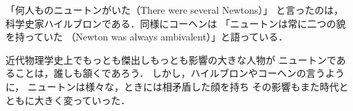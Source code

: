 \documentclass{jsarticle}
\begin{document}
「何人ものニュートンがいた（There were several Newtons）」
と言ったのは，科学史家ハイルブロンである．同様にコーヘンは
「ニュートンは常に二つの貌を持っていた
（Newton was always ambivalent）」と語っている．

近代物理学史上でもっとも傑出しもっとも影響の大きな人物が
ニュートンであることは，誰しも頷くであろう．
しかし，ハイルブロンやコーヘンの言うように，
ニュートンは様々な，ときには相矛盾した顔を持ち
その影響もまた時代とともに大きく変っていった．
\end{document}
